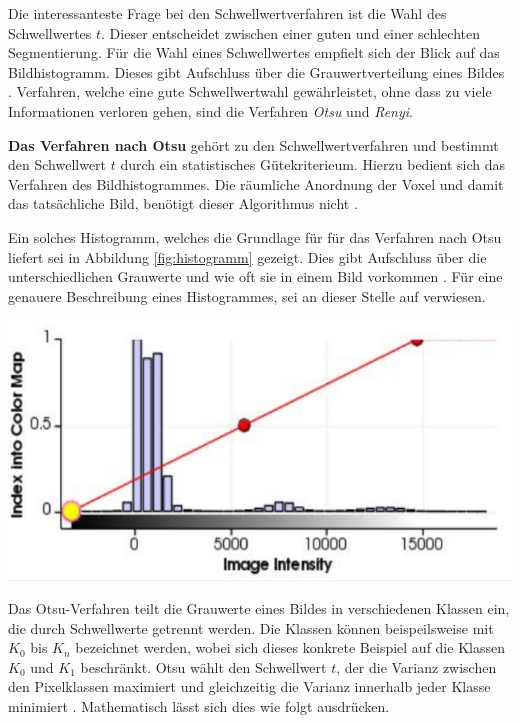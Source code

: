 Die interessanteste Frage bei den Schwellwertverfahren ist die Wahl des
Schwellwertes $t$. Dieser entscheidet zwischen einer guten und einer schlechten Segmentierung.
Für die Wahl eines Schwellwertes empfielt sich der Blick auf das Bildhistogramm.
Dieses gibt Aufschluss über die Grauwertverteilung eines Bildes \citep[vgl.][Seite361]{lehmann2013bildverarbeitung}.
Verfahren, welche eine gute Schwellwertwahl gewährleistet, ohne dass zu viele
Informationen verloren gehen, sind die Verfahren \textit{Otsu} und \textit{Renyi}.

\pagebreak

\textbf{Das Verfahren nach Otsu} gehört zu den Schwellwertverfahren und bestimmt
den Schwellwert $t$ durch ein statistisches Gütekriterieum. Hierzu bedient sich
das Verfahren des Bildhistogrammes. Die räumliche Anordnung der Voxel und damit das
tatsächliche Bild, benötigt dieser Algorithmus nicht \citep[vgl.][Seite 264]{lehmann2013bildverarbeitung}.

\begin{minipage}{0.40\textwidth}
	Ein solches Histogramm, welches die Grundlage für für das Verfahren nach Otsu
	liefert sei in Abbildung \ref{fig:histogramm} gezeigt. Dies gibt Aufschluss über
	die unterschiedlichen Grauwerte und wie oft sie in einem Bild vorkommen \citep[vgl.][Seite264]{lehmann2013bildverarbeitung}.
	Für eine genauere Beschreibung eines Histogrammes, sei an dieser Stelle auf \citet[Seite42]{burger2009}
	verwiesen.
\end{minipage}
\hfill
\begin{minipage}{0.50\textwidth}
	\centering
	\includegraphics[width=1\textwidth]{img/histogramm.jpg}
	 \label{fig:histogramm}
\end{minipage}

Das Otsu-Verfahren teilt die Grauwerte eines Bildes in verschiedenen Klassen ein,
die durch Schwellwerte getrennt werden. Die Klassen können beispeilsweise mit $K_{0}$
bis $K_{n}$ bezeichnet werden, wobei sich dieses konkrete Beispiel auf die
Klassen $K_{0}$ und $K_{1}$ beschränkt. Otsu wählt den Schwellwert $t$, der die
Varianz zwischen den Pixelklassen maximiert und gleichzeitig die Varianz
innerhalb jeder Klasse minimiert \citep[vgl.][S.~264]{lehmann2013bildverarbeitung}.
Mathematisch lässt sich dies wie folgt ausdrücken.

